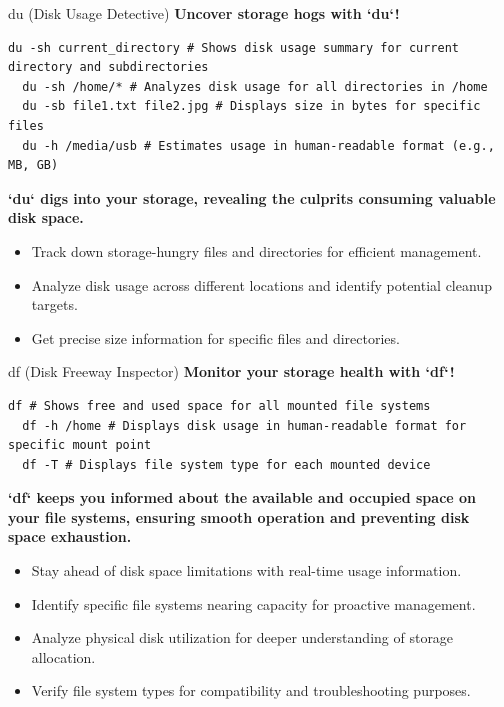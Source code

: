 \documentclass{beamer}
\begin{document}
\begin{frame}[fragile]{du (Disk Usage Detective)}
  \textbf{Uncover storage hogs with `du`!}

  \begin{lstlisting}[frame=none]
  du -sh current_directory # Shows disk usage summary for current directory and subdirectories
  du -sh /home/* # Analyzes disk usage for all directories in /home
  du -sb file1.txt file2.jpg # Displays size in bytes for specific files
  du -h /media/usb # Estimates usage in human-readable format (e.g., MB, GB)
  \end{lstlisting}

  \textbf{`du` digs into your storage, revealing the culprits consuming valuable disk space.}

  \begin{itemize}
    \item Track down storage-hungry files and directories for efficient management.
    \item Analyze disk usage across different locations and identify potential cleanup targets.
    \item Get precise size information for specific files and directories.
  \end{itemize}
\end{frame}

\begin{frame}[fragile]{df (Disk Freeway Inspector)}
  \textbf{Monitor your storage health with `df`!}

  \begin{lstlisting}[frame=none]
  df # Shows free and used space for all mounted file systems
  df -h /home # Displays disk usage in human-readable format for specific mount point
  df -T # Displays file system type for each mounted device
  \end{lstlisting}

  \textbf{`df` keeps you informed about the available and occupied space on your file systems, ensuring smooth operation and preventing disk space exhaustion.}

  \begin{itemize}
    \item Stay ahead of disk space limitations with real-time usage information.
    \item Identify specific file systems nearing capacity for proactive management.
    \item Analyze physical disk utilization for deeper understanding of storage allocation.
    \item Verify file system types for compatibility and troubleshooting purposes.
  \end{itemize}
\end{frame}
\end{document}
